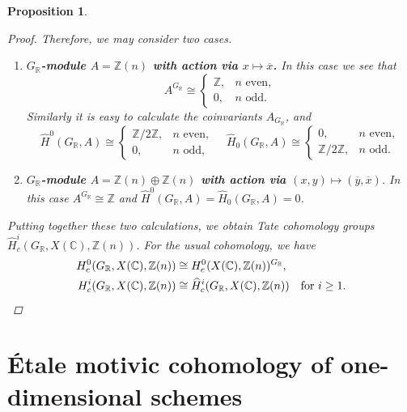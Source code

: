 \documentclass[draft]{article}
\newcommand{\CC}{\mathbb{C}}
\newcommand{\RR}{\mathbb{R}}
\newcommand{\ZZ}{\mathbb{Z}}
\theoremstyle{myplain}
\newtheorem{proposition}[theorem]{Proposition}
\theoremstyle{mydefinition}
\numberwithin{equation}{section}
\begin{document}
\begin{proposition}
\begin{proof}
    Therefore, we may consider two cases.
    \begin{enumerate}
    \item[1)] \textbf{$G_\RR$-module $A = \ZZ (n)$ with action via
        $x \mapsto \overline{x}$.}
      In this case we see that
      \[ A^{G_\RR} \cong
        \begin{cases}
          \ZZ, & n\text{ even}, \\
          0, & n\text{ odd}.
        \end{cases} \]
      Similarly it is easy to calculate the coinvariants $A_{G_\RR}$, and
      \[ \widehat{H}^0 (G_\RR, A) \cong
        \begin{cases}
          \ZZ/2\ZZ, & n\text{ even},\\
          0, & n\text{ odd},
        \end{cases} \quad
        \widehat{H}_0 (G_\RR, A) \cong
        \begin{cases}
          0, & n\text{ even},\\
          \ZZ/2\ZZ, & n\text{ odd}.
        \end{cases} \]

    \item[2)] \textbf{$G_\RR$-module $A = \ZZ (n) \oplus \ZZ (n)$ with action
        via $(x,y) \mapsto (\overline{y}, \overline{x})$}. In this case
      $A^{G_\RR} \cong \ZZ$ and
      $\widehat{H}^0 (G_\RR,A) = \widehat{H}_0 (G_\RR,A) = 0$.
    \end{enumerate}

    Putting together these two calculations, we obtain Tate cohomology groups
    $\widehat{H}^i_c (G_\RR, X(\CC), \ZZ (n))$. For the usual cohomology, we
    have
    \begin{align*}
      H^0_c (G_\RR, X(\CC), \ZZ (n)) & \cong H^0_c (X(\CC), \ZZ (n))^{G_\RR}, \\
      H^i_c (G_\RR, X(\CC), \ZZ (n)) & \cong \widehat{H}^i_c (G_\RR, X(\CC), \ZZ (n)) \quad \text{for }i \ge 1. \qedhere
    \end{align*}
  \end{proof}
\end{proposition}


\section{\'{E}tale motivic cohomology of one-dimensional schemes}
\label{sec:etale-motivic-cohomology}
\end{document}
